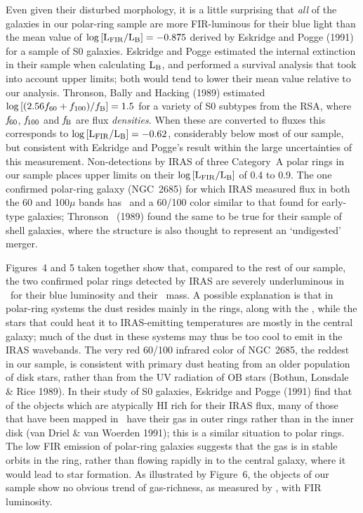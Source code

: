 Even given their disturbed morphology, it is a little surprising 
that {\it all\/} of the galaxies 
in our polar-ring sample are more FIR-luminous for their blue light 
than the mean value of 
$\log{[\rm L_{\rm FIR}/L_{\rm B}]} = -0.875$ derived by Eskridge and 
Pogge (1991) for a sample of S0 galaxies.  Eskridge and Pogge estimated 
the internal extinction in their sample when calculating $\rm L_B$, and 
performed a survival analysis that took into account upper limits; both would 
tend to lower their mean value relative to our analysis.  Thronson, 
Bally and Hacking (1989) estimated   
$\log{[(2.56 f_{60} + f_{100})/f_{\rm B}]} = 1.5$ for a variety of S0 subtypes 
from the RSA, where ${\it f}_{60}$, ${\it f}_{100}$ and 
${\it f}_{\rm B}$ are flux {\it densities.\/}  
When these are converted to fluxes 
this corresponds to $\log{[\rm L_{\rm FIR}/L_{\rm B}]} = -0.62$, 
considerably below most  
of our sample, but consistent with Eskridge and Pogge's result within the large 
uncertainties of this measurement.   Non-detections by IRAS of three 
Category~A polar rings in our sample places upper limits on their 
$\log{[\rm L_{\rm FIR}/L_{\rm B}]}$ of 0.4 to 0.9.  
The one confirmed polar-ring galaxy (NGC~2685) 
for which IRAS measured flux in both the 60 and 100$\mu$ bands has  
\LFIRLB\ and a 60/100 color similar to that found for early-type galaxies; 
Thronson \etal\ (1989) found the same to be true for their 
sample of shell galaxies, where the structure is also thought to 
represent an `undigested' merger. 

Figures~4 and 5 taken together show that, compared to the rest of our 
sample, the two confirmed polar rings detected by IRAS are severely
underluminous in \LFIR\ for their blue luminosity and their \HI\ mass.  
A possible explanation is that in polar-ring systems the dust resides
mainly in the rings, along with the \HI, while the stars that could
heat it to IRAS-emitting temperatures are mostly in the central galaxy;
much of the dust in these systems may thus be too cool to emit in the
IRAS wavebands. 
The very red 60/100 infrared color of NGC~2685, the reddest in our sample, 
is consistent with primary dust heating from an older population of disk 
stars, rather than from the UV radiation of OB stars 
(Bothun, Lonsdale \& Rice 1989).  
In their study of S0 galaxies, Eskridge and Pogge (1991) find that of 
the objects which are atypically HI rich for their IRAS flux, many of 
those that have been mapped in \HI\ have their gas in outer rings
rather than in the inner disk (van Driel \& van Woerden 1991); this is a
similar situation to polar rings.  The low FIR emission of polar-ring 
galaxies suggests 
that the gas is in stable orbits in the ring, rather than flowing 
rapidly in to the central galaxy, where it would lead to star formation.
As illustrated by Figure~6, the objects of our sample show no obvious 
trend of gas-richness, as measured by \MHILB, with FIR luminosity.  

